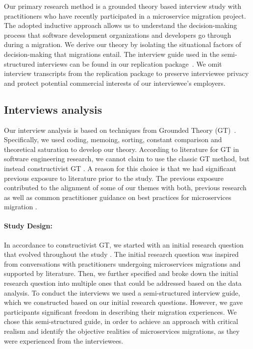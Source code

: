 \documentclass[sigconf,dvipsnames]{acmart}
\begin{document}
Our primary research method is a grounded theory based interview study with practitioners who have recently participated in a microservice migration project. 
The adopted inductive approach allows us to understand the decision-making process that software development organizations and developers go through during a migration. We derive our theory by isolating the situational factors of decision-making that migrations entail.
The interview guide used in the semi-structured interviews can be found in our replication package~\cite{michael_ayas_hamdy_2021_5060129}. We omit interview transcripts from the replication package to preserve interviewee privacy and protect potential commercial interests of our interviewee's employers.

\subsection{Interviews analysis}
Our interview analysis is based on techniques from Grounded Theory (GT)~\cite{charmaz2014constructing}. Specifically, we used coding, memoing, sorting, constant comparison and theoretical saturation to develop our theory. According to literature for GT in software engineering research, 
we cannot claim to use the classic GT method, but instead constructivist GT \cite{Stol2016}. A reason for this choice is that we had significant previous exposure to literature prior to the study. The previous exposure contributed to the alignment of some of our themes with both, previous research~\cite{Balalaie2018, Hassan2020} as well as common practitioner guidance on best practices for microservices migration \cite{newman2019monolith}. 

\paragraph*{Study Design:}
In accordance to constructivist GT, we started with an initial research question that evolved throughout the study \cite{Stol2016}. The initial research question was inspired from conversations with practitioners undergoing microservices migrations and supported by literature. Then, we further specified and broke down the initial research question into multiple ones that could be addressed based on the data analysis.
To conduct the interviews we used a semi-structured interview guide, which we constructed based on our initial research questions. However, we gave participants significant freedom in describing their migration experiences.
We chose this semi-structured guide, in order to achieve an approach with critical realism and identify the objective realities of microservices migrations, as they were experienced from the interviewees. 
\end{document}
